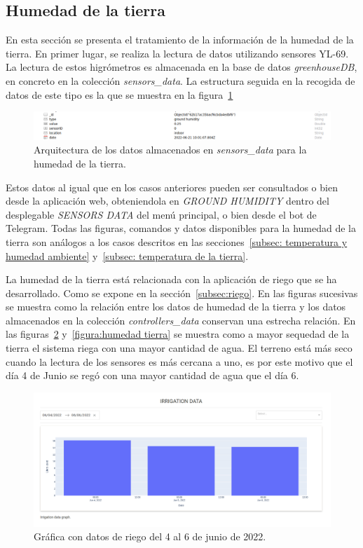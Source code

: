 \documentclass[a4paper, 12pt, oneside]{book}
\begin{document}
\subsection{Humedad de la tierra}
\label{subsec: humedad de la tierra}
En esta sección se presenta el tratamiento de la información de la humedad de la tierra. En primer lugar, se realiza la lectura de datos utilizando sensores YL-69. La lectura de estos higrómetros es almacenada en la base de datos \textit{greenhouseDB}, en concreto en la colección \textit{sensors\_data}. La estructura seguida en la recogida de datos de este tipo es la que se muestra en la figura~\ref{figura:arquitectura_humedad_tierra}

\begin{figure}[H]
	\centering
    \includegraphics[width=12cm, keepaspectratio]{img/arquitectura_humedad_tierra}
    \caption{Arquitectura de los datos almacenados en \textit{sensors\_data} para la humedad de la tierra.}
    \label{figura:arquitectura_humedad_tierra}
\end{figure}

Estos datos al igual que en los casos anteriores pueden ser consultados o bien desde la aplicación web, obteniendola en \textit{GROUND HUMIDITY} dentro del desplegable \textit{SENSORS DATA} del menú principal, o bien desde el bot de Telegram. Todas las figuras, comandos y datos disponibles para la humedad de la tierra son análogos a los casos descritos en las secciones~\ref{subsec: temperatura y humedad ambiente} y~\ref{subsec: temperatura de la tierra}.

La humedad de la tierra está relacionada con la aplicación de riego que se ha desarrollado. Como se expone en la sección~\ref{subsec:riego}. En las figuras sucesivas se muestra como la relación entre los datos de humedad de la tierra y los datos almacenados en la colección \textit{controllers\_data} conservan una estrecha relación.
En las figuras~\ref{figura:figura riego} y~\ref{figura:humedad tierra} se muestra como a mayor sequedad de la tierra el sistema riega con una mayor cantidad de agua. El terreno está más seco cuando la lectura de los sensores es más cercana a uno, es por este motivo que el día 4 de Junio se regó con una mayor cantidad de agua que el día 6.

\begin{figure}[H]
	\centering
    \includegraphics[width=12cm, keepaspectratio]{img/figura_riego}
    \caption{Gráfica con datos de riego del 4 al 6 de junio de 2022.}
    \label{figura:figura riego}
\end{figure}
\end{document}
